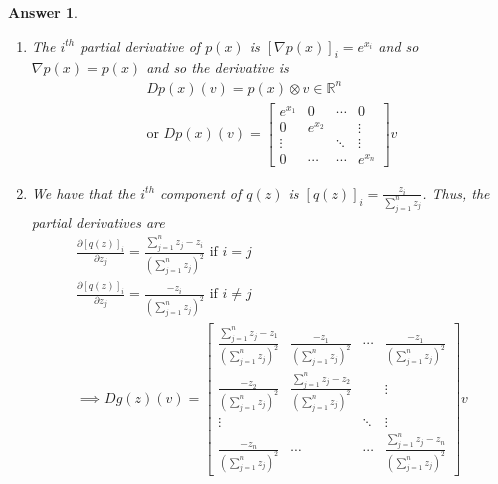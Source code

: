 \documentclass[12pt]{article}
\theoremstyle{colon}
\newtheorem*{answer}{Answer}
\begin{document}
\begin{answer}
  \

  \begin{enumerate}[label=\alph*)]
    \item The $i^{th}$ partial derivative of $p(x)$ is $[\nabla p(x)]_i = e^{x_i}$ and so $\nabla p(x) = p(x)$ and so the derivative is
      \begin{gather*}
        D p(x)(v) = p(x) \otimes v \in \mathbb{R}^n \\
        \text{or } D p(x)(v) = \begin{bmatrix} e^{x_1} & 0 & \dotsm & 0 \\ 0 & e^{x_2} & & \vdots \\ \vdots & & \ddots & \vdots \\ 0 & \dotsm & \dotsm & e^{x_n} \end{bmatrix} v
      \end{gather*}

    \item We have that the $i^{th}$ component of $q(z)$ is $[q(z)]_i = \frac{z_i}{\sum_{j=1}^n z_j}$. Thus, the partial derivatives are
      \begin{gather*}
        \frac{\partial [q(z)]_i}{\partial z_j} = \frac{\sum_{j=1}^n z_j - z_i}{(\sum_{j=1}^n z_j)^2} \text{ if } i = j \\
        \frac{\partial [q(z)]_i}{\partial z_j} = \frac{-z_i}{(\sum_{j=1}^n z_j)^2} \text{ if } i \neq j \\
        \implies Dg(z)(v) = \begin{bmatrix} \frac{\sum_{j=1}^n z_j - z_1}{(\sum_{j=1}^n z_j)^2} & \frac{-z_1}{(\sum_{j=1}^n z_j)^2} & \dotsm & \frac{-z_1}{(\sum_{j=1}^n z_j)^2} \\ \frac{-z_2}{(\sum_{j=1}^n z_j)^2} & \frac{\sum_{j=1}^n z_j - z_2}{(\sum_{j=1}^n z_j)^2} & & \vdots \\ \vdots & & \ddots & \vdots \\ \frac{-z_n}{(\sum_{j=1}^n z_j)^2} & \dotsm & \dotsm & \frac{\sum_{j=1}^n z_j - z_n}{(\sum_{j=1}^n z_j)^2} \end{bmatrix} v
      \end{gather*}


\end{enumerate}
\end{answer}
\end{document}
